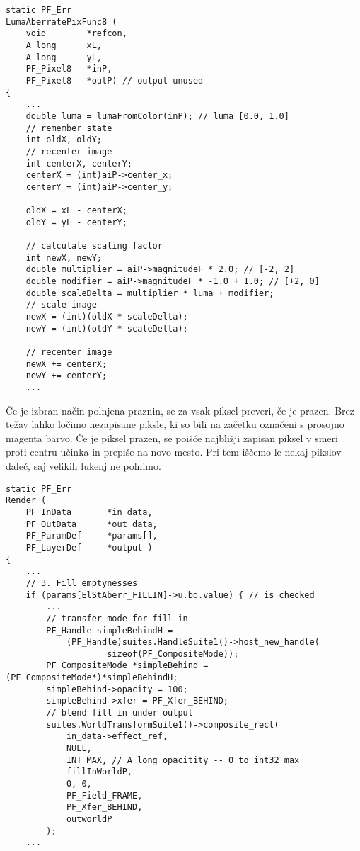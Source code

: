 \documentclass[a4paper, 12pt]{book}
\begin{document}
\begin{verbatim}
static PF_Err
LumaAberratePixFunc8 (
    void        *refcon, 
    A_long      xL, 
    A_long      yL, 
    PF_Pixel8   *inP, 
    PF_Pixel8   *outP) // output unused
{
    ...
    double luma = lumaFromColor(inP); // luma [0.0, 1.0]
    // remember state
    int oldX, oldY;
    // recenter image
    int centerX, centerY;
    centerX = (int)aiP->center_x;
    centerY = (int)aiP->center_y;

    oldX = xL - centerX;
    oldY = yL - centerY;

    // calculate scaling factor
    int newX, newY;
    double multiplier = aiP->magnitudeF * 2.0; // [-2, 2]
    double modifier = aiP->magnitudeF * -1.0 + 1.0; // [+2, 0]
    double scaleDelta = multiplier * luma + modifier;
    // scale image
    newX = (int)(oldX * scaleDelta);
    newY = (int)(oldY * scaleDelta);

    // recenter image
    newX += centerX;
    newY += centerY;
    ...
\end{verbatim}

Če je izbran način polnjena praznin, se za vsak piksel preveri, če je prazen.
Brez težav lahko ločimo nezapisane piksle, ki so bili na začetku označeni s prosojno magenta barvo.
Če je piksel prazen, se poišče najbližji zapisan piksel v smeri proti centru učinka in prepiše na novo mesto.
Pri tem iščemo le nekaj pikslov daleč, saj velikih lukenj ne polnimo.

\begin{verbatim}
static PF_Err 
Render (
    PF_InData       *in_data,
    PF_OutData      *out_data,
    PF_ParamDef     *params[],
    PF_LayerDef     *output )
{
    ...
    // 3. Fill emptynesses
    if (params[ElStAberr_FILLIN]->u.bd.value) { // is checked
        ...
        // transfer mode for fill in
        PF_Handle simpleBehindH = 
            (PF_Handle)suites.HandleSuite1()->host_new_handle(
                    sizeof(PF_CompositeMode));
        PF_CompositeMode *simpleBehind = (PF_CompositeMode*)*simpleBehindH;
        simpleBehind->opacity = 100;
        simpleBehind->xfer = PF_Xfer_BEHIND;
        // blend fill in under output
        suites.WorldTransformSuite1()->composite_rect(
            in_data->effect_ref,
            NULL,
            INT_MAX, // A_long opacitity -- 0 to int32 max
            fillInWorldP,
            0, 0,
            PF_Field_FRAME,
            PF_Xfer_BEHIND,
            outworldP
        );
    ...
\end{verbatim}
\end{document}
